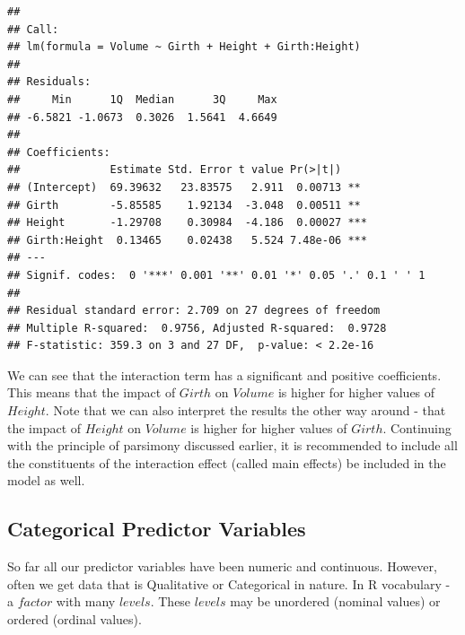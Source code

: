 \documentclass[10pt, letterpaper, twoside]{memoir}\usepackage{knitr}
\begin{document}
\begin{knitrout}
\color{fgcolor}\begin{kframe}
\begin{alltt}
 \hlkwb{<-}  \hlopt{~}  \hlopt{+}  \hlopt{+} \hlopt{:}
\end{alltt}
\begin{verbatim}
## 
## Call:
## lm(formula = Volume ~ Girth + Height + Girth:Height)
## 
## Residuals:
##     Min      1Q  Median      3Q     Max 
## -6.5821 -1.0673  0.3026  1.5641  4.6649 
## 
## Coefficients:
##              Estimate Std. Error t value Pr(>|t|)    
## (Intercept)  69.39632   23.83575   2.911  0.00713 ** 
## Girth        -5.85585    1.92134  -3.048  0.00511 ** 
## Height       -1.29708    0.30984  -4.186  0.00027 ***
## Girth:Height  0.13465    0.02438   5.524 7.48e-06 ***
## ---
## Signif. codes:  0 '***' 0.001 '**' 0.01 '*' 0.05 '.' 0.1 ' ' 1
## 
## Residual standard error: 2.709 on 27 degrees of freedom
## Multiple R-squared:  0.9756,	Adjusted R-squared:  0.9728 
## F-statistic: 359.3 on 3 and 27 DF,  p-value: < 2.2e-16
\end{verbatim}
\end{kframe}
\end{knitrout}

We can see that the interaction term has a significant and positive coefficients. This means that the impact of $Girth$ on $Volume$ is higher for higher values of $Height$. Note that we can also interpret the results the other way around - that the impact of $Height$ on $Volume$ is higher for higher values of $Girth$. Continuing with the principle of parsimony discussed earlier, it is recommended to include all the constituents of the interaction effect (called main effects) be included in the model as well.

\subsection{Categorical Predictor Variables}

So far all our predictor variables have been numeric and continuous. However, often we get data that is Qualitative or Categorical in nature. In R vocabulary - a $factor$ with many $levels$. These $levels$ may be unordered (nominal values) or ordered (ordinal values).
\end{document}
